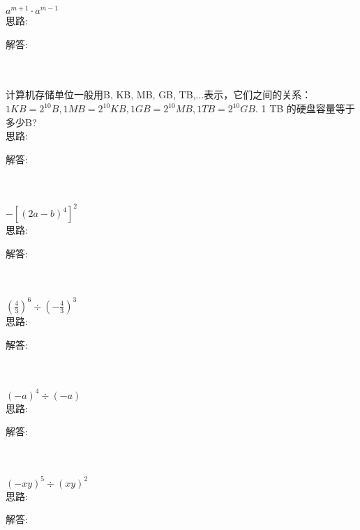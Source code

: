 \item {
    $ a^{m+1}\cdot a^{m-1}$
    \ifshowSolution
        \fangsong{}
        \\
        思路:

        解答: 
    \else
        \\ \\ \\
    \fi
}

\item {
    计算机存储单位一般用B, KB, MB, GB, TB,...表示，它们之间的关系：$1 KB = 2^{10} B, 1 MB = 2^{10} KB, 1 GB = 2^{10} MB, 1 TB = 2^{10} GB.$ 1 TB 的硬盘容量等于多少B?
    \ifshowSolution
        \fangsong{}
        \\
        思路:

        解答: 
    \else
        \\ \\ \\
    \fi
}

\item {
    $ -[(2a-b)^{4}]^{2}$ 
    \ifshowSolution
        \fangsong{}
        \\
        思路:

        解答: 
    \else
        \\ \\ \\
    \fi
}

\item {
    $ (\frac{4}{3})^{6}\div (-\frac{4}{3})^{3} $
    \ifshowSolution
        \fangsong{}
        \\
        思路:

        解答: 
    \else
        \\ \\ \\
    \fi
}

\item {
    $ (-a)^{4}\div (-a) $
    \ifshowSolution
        \fangsong{}
        \\
        思路:

        解答: 
    \else
        \\ \\ \\
    \fi
}

\item {
    $ (-xy)^{5}\div (xy)^{2} $
    \ifshowSolution
        \fangsong{}
        \\
        思路:

        解答: 
    \else
        \\ \\ \\
    \fi
}

